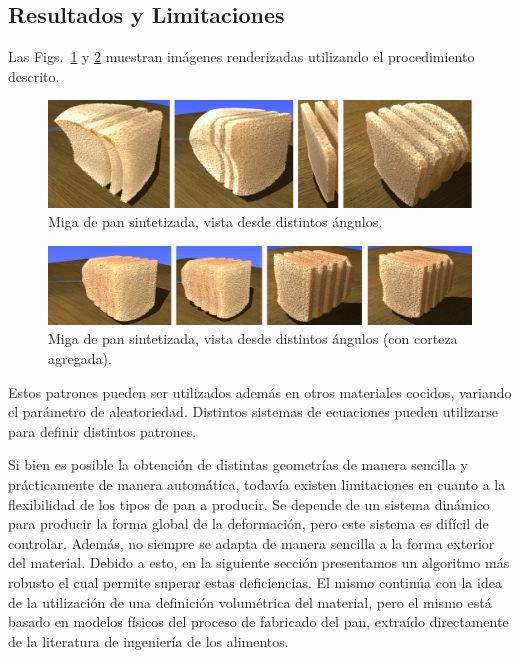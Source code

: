 \subsection{Resultados y Limitaciones}
Las Figs.~\ref{fg:crumb} y \ref{fg:results2} muestran imágenes renderizadas utilizando el procedimiento descrito.

\begin{figure}
  \centerline{\includegraphics[width=13cm]{figures/crumb}}
  \caption{Miga de pan sintetizada, vista desde distintos ángulos.}
  \label{fg:crumb}
\end{figure}


\begin{figure}
  \centerline{\includegraphics[width=13cm]{figures/results2}}
  \caption{Miga de pan sintetizada, vista desde distintos ángulos (con corteza agregada).}
  \label{fg:results2}
\end{figure}

Estos patrones pueden ser utilizados adem\'as en otros materiales cocidos, variando el par\'ametro de aleatoriedad. Distintos sistemas de ecuaciones pueden utilizarse para definir distintos patrones.

Si bien es posible la obtención de distintas geometrías de manera sencilla y prácticamente de manera automática, todavía existen limitaciones en cuanto a la flexibilidad de los tipos de pan a producir.
Se depende de un sistema dinámico para producir la forma global de la deformación, pero este sistema es difícil de controlar.
Además, no siempre se adapta de manera sencilla a la forma exterior del material.
Debido a esto, en la siguiente sección presentamos un algoritmo más robusto el cual permite superar estas deficiencias.
El mismo continúa con la idea de la utilización de una definición volumétrica del material, pero el mismo está basado en modelos físicos del proceso de fabricado del pan, extraído directamente de la literatura de ingeniería de los alimentos.

